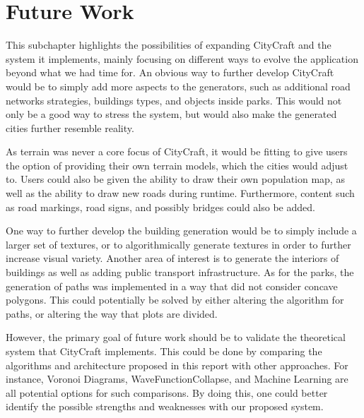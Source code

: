 \section{Future Work}
This subchapter highlights the possibilities of expanding CityCraft and the system it implements, mainly focusing on different ways to evolve the application beyond what we had time for.
An obvious way to further develop CityCraft would be to simply add more aspects to the generators, such as additional road networks strategies, buildings types, and objects inside parks.
This would not only be a good way to stress the system, but would also make the generated cities further resemble reality.
 
As terrain was never a core focus of CityCraft, it would be fitting to give users the option of providing their own terrain models, which the cities would adjust to.
Users could also be given the ability to draw their own population map, as well as the ability to draw new roads during runtime.
Furthermore, content such as road markings, road signs, and possibly bridges could also be added.
  
One way to further develop the building generation would be to simply include a larger set of textures, or to algorithmically generate textures in order to further increase visual variety.
Another area of interest is to generate the interiors of buildings as well as adding public transport infrastructure.
As for the parks, the generation of paths was implemented in a way that did not consider concave polygons.
This could potentially be solved by either altering the algorithm for paths, or altering the way that plots are divided.

However, the primary goal of future work should be to validate the theoretical system that CityCraft implements.
This could be done by comparing the algorithms and architecture proposed in this report with other approaches.
For instance, Voronoi Diagrams, WaveFunctionCollapse, and Machine Learning are all potential options for such comparisons.
By doing this, one could better identify the possible strengths and weaknesses with our proposed system.
